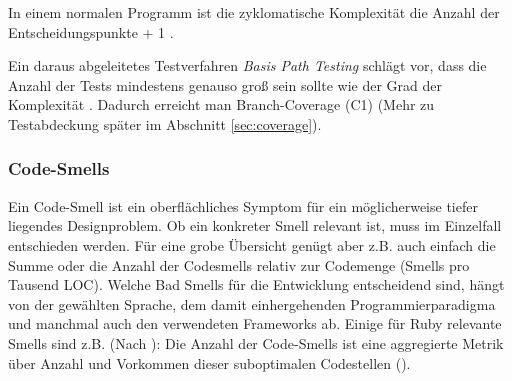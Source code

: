 
In einem normalen Programm ist die zyklomatische Komplexität die Anzahl der Entscheidungspunkte + 1 \citep[S. 314]{mccabe_complexity_1976}.

Ein daraus abgeleitetes Testverfahren \textit{Basis Path Testing} schlägt vor, dass die Anzahl der Tests mindestens genauso groß sein sollte wie der Grad der Komplexität \citep[S. 318]{mccabe_complexity_1976}. Dadurch erreicht man Branch-Coverage (C1) (Mehr zu Testabdeckung später im Abschnitt \ref{sec:coverage}).

\subsubsection{Code-Smells}
\label{sec:smells}

  Ein Code-Smell ist ein oberflächliches Symptom für ein möglicherweise tiefer liegendes Designproblem. Ob ein konkreter Smell relevant ist, muss im Einzelfall entschieden werden. Für eine grobe Übersicht genügt aber z.B. auch einfach die Summe oder die Anzahl der Codesmells relativ zur Codemenge (Smells pro Tausend LOC). Welche Bad Smells für die Entwicklung entscheidend sind, hängt von der gewählten Sprache, dem damit einhergehenden Programmierparadigma und manchmal auch den verwendeten Frameworks ab. Einige für Ruby relevante Smells sind z.B. (Nach \citep{kevin_rutherford_code_2010}):
    Die Anzahl der Code-Smells ist eine aggregierte Metrik über Anzahl und Vorkommen dieser suboptimalen Codestellen ().

